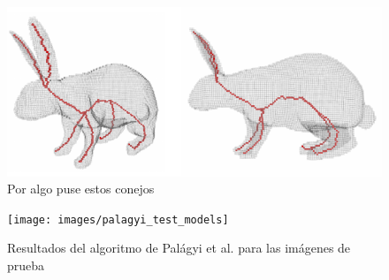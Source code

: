 \begin{figure}[H]\centering
\includegraphics[width=0.95\linewidth]{images/palagyi_rabbit_demo}
\caption{Por algo puse estos conejos}
\label{fig:palagyi_rabbit_demo}
\end{figure}

\begin{figure}[H]\centering
\texttt{[image: images/palagyi\_test\_models]}
\caption{Resultados del algoritmo de Palágyi et al. para las imágenes de prueba}
\label{fig:palagyi_test_models}
\end{figure}
